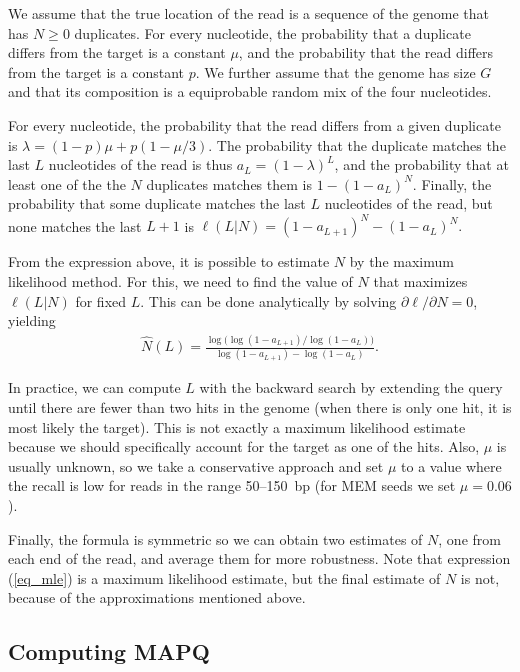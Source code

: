 \documentclass[a4,center,fleqn]{NAR}
\begin{document}
We assume that the true location of the read is a sequence of the genome
that has $N \geq 0$ duplicates. For every nucleotide, the probability that
a duplicate differs from the target is a constant $\mu$, and the
probability that the read differs from the target is a constant $p$. We
further assume that the genome has size $G$ and that its composition is a
equiprobable random mix of the four nucleotides.

For every nucleotide, the probability that the read differs from a given
duplicate is $\lambda = (1-p)\mu + p(1-\mu/3)$. The probability that the
duplicate matches the last $L$ nucleotides of the read is thus $a_L =
(1-\lambda)^L$, and the probability that at least one of the the $N$
duplicates matches them is $1-(1-a_L)^N$. Finally, the probability that
some duplicate matches the last $L$ nucleotides of the read, but none
matches the last $L+1$ is $\ell(L|N) = (1-a_{L+1})^N-(1-a_L)^N.$

From the expression above, it is possible to estimate $N$ by the maximum
likelihood method. For this, we need to find the value of $N$ that
maximizes $\ell(L|N)$ for fixed $L$. This can be done analytically by
solving $\partial \ell / \partial N = 0$, yielding
\begin{align}
\label{eq_mle}
\hat{N}(L) =\frac{ \log \big( \log(1-a_{L+1}) / \log(1-a_L) \big)} {
\log(1-a_{L+1}) - \log(1-a_L) }.
\end{align}

In practice, we can compute $L$ with the backward search by extending the
query until there are fewer than two hits in the genome (when there is
only one hit, it is most likely the target). This is not exactly a maximum
likelihood estimate because we should specifically account for the target
as one of the hits. Also, $\mu$ is usually unknown, so we take a
conservative approach and set $\mu$ to a value where the recall is low for
reads in the range 50--150~bp (for MEM seeds we set $\mu = 0.06$).

Finally, the formula is symmetric so we can obtain two estimates of $N$,
one from each end of the read, and average them for more robustness. Note
that expression (\ref{eq_mle}) is a maximum likelihood estimate, but the
final estimate of $N$ is not, because of the approximations mentioned
above.

\subsection{Computing MAPQ}
\end{document}
